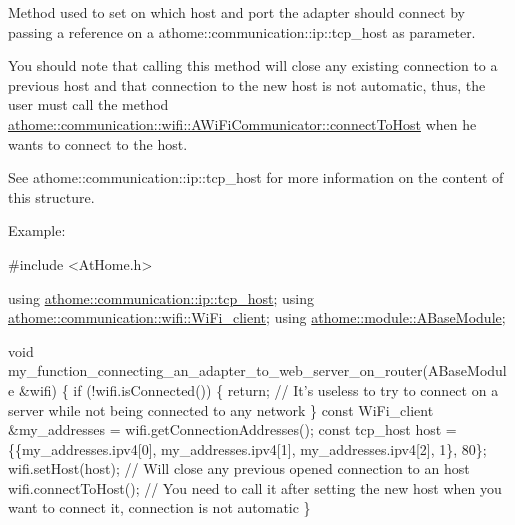 Method used to set on which host and port the adapter should connect by passing a reference on a athome\+::communication\+::ip\+::tcp\+\_\+host as parameter.

You should note that calling this method will close any existing connection to a previous host and that connection to the new host is not automatic, thus, the user must call the method \mbox{\hyperlink{classathome_1_1communication_1_1_a_network_communicator_a370176dae8f38225446e83a132dbcff7}{athome\+::communication\+::wifi\+::\+A\+Wi\+Fi\+Communicator\+::connect\+To\+Host}} when he wants to connect to the host.

See athome\+::communication\+::ip\+::tcp\+\_\+host for more information on the content of this structure.

Example\+:


\begin{DoxyCode}
\textcolor{preprocessor}{#include <AtHome.h>}

\textcolor{keyword}{using} \mbox{\hyperlink{structathome_1_1communication_1_1ip_1_1s__host}{athome::communication::ip::tcp\_host}};
\textcolor{keyword}{using} \mbox{\hyperlink{structathome_1_1communication_1_1wifi_1_1s__wifi__client}{athome::communication::wifi::WiFi\_client}};
\textcolor{keyword}{using} \mbox{\hyperlink{classathome_1_1module_1_1_a_base_module}{athome::module::ABaseModule}};

\textcolor{keywordtype}{void} my\_function\_connecting\_an\_adapter\_to\_web\_server\_on\_router(ABaseModule &wifi) \{
  \textcolor{keywordflow}{if} (!wifi.isConnected()) \{
    \textcolor{keywordflow}{return}; \textcolor{comment}{// It's useless to try to connect on a server while not being connected to any network}
  \}
  \textcolor{keyword}{const} WiFi\_client &my\_addresses = wifi.getConnectionAddresses();
  \textcolor{keyword}{const} tcp\_host host = \{\{my\_addresses.ipv4[0], my\_addresses.ipv4[1], my\_addresses.ipv4[2], 1\}, 80\};
  wifi.setHost(host); \textcolor{comment}{// Will close any previous opened connection to an host}
  wifi.connectToHost(); \textcolor{comment}{// You need to call it after setting the new host when you want to connect it,
       connection is not automatic}
\}
\end{DoxyCode}
 \mbox{\label{classathome_1_1communication_1_1_a_network_communicator_a87adf68359a4ec5b0a38bea529ebf732}} 
